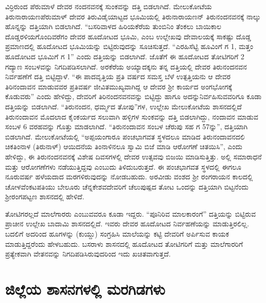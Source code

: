 ವಿರ್ರಿರುಂದ ಪೆರುಮಾಳೆ ದೇವರ ನಂದನವನಕ್ಕೆ ಸುಂಕವನ್ನು ದತ್ತಿ ಬಿಡಲಾಗಿದೆ. ಮೇಲುಕೋಟೆಯ ತಿರುನಾರಾಯಣಪೆರುಮಾಳ್​ ದೇವರ ತಿರುವಿಡೈಯಾಟ್ಟದ ಭೂಮಿಯಲ್ಲಿ ತಿರುನಾರಾಯಣನ್​ ತಿರುನಂದನವನಕ್ಕೆ ನಾಲ್ಕು ಹೊನ್ನನ್ನು ದತ್ತಿಯಾಗಿ ಬಿಡಲಾಗಿದೆ. “ಬಸರಿವಾಳದ ಹಿರಿಯಕೆರೆಯ ತುಂಬಿನಿಂ ತೆಂಕಲು ಬಾಯಿಕಾಲ ದೊಡ್ಡರಳಿಯಗೊಂದಿವರೆಗಂ ದೇವರ ಹೂದೋಟದ ಭೂಮಿ, ಎಂಬ ಉಲ್ಲೇಖವು ದೇವಾಲಯಕ್ಕೆ ಸಾಕಷ್ಟು ದೊಡ್ಡ ಪ್ರಮಾಣದಲ್ಲಿ ಹೂದೋಟದ ಭೂಮಿಯನ್ನು ಬಿಟ್ಟಿರುವುದನ್ನು ಸೂಚಿಸುತ್ತದೆ. “ಎರಹಿಸೆಟ್ಟಿ ಹೂವಿಂಗೆ ಗ 1, ಮತ್ತಂ ಹೂದೋಟದ ಭೂಮಿಗೆ ಗ 1” ಎಂದು ದತ್ತಿಯನ್ನು ಬಿಡಲಾಗಿದೆ. ಜೊತೆಗೆ ಈ ಹೂದೋಟದ ತೋಟಿಗರಿಗೆ 2 ಗದ್ಯಾಣ ಸಂಬಳವನ್ನು ನಿಗದಿಪಡಿಸಲಾಗಿದೆ. ಅರಕೆರೆಯ ಅಯ್ಯಾದಕ್ಕನು ತನ್ನ ದತ್ತಿಯಲ್ಲಿ ದೇವರ ತಿರುನಂದನವನ ನಿರ್ವಹಣೆಗೆ ದತ್ತಿ ಬಿಟ್ಟಿದ್ದಾಳೆ. “ಈ ಪಾದವೃತ್ತಿಯ ಪ್ರತಿ ವರ್ಷದ ಸಮಸ್ತ ಬೆಳೆ ಉತ್ಪತ್ತಿಯನು ಆ ದೇವರ ತಿರಿನಂದಾವನ ಮಾಡುವವರ ಪ್ರತಿವರ್ಷ ಜೀವಿತಮುಖ್ಯವಾಗಿದ್ದ ಆ ದೇವರ ಶ‍್ರೀ ಕಾರ್ಯದ ಅಂಗಭೋಗಕ್ಕೆ ಕೊಡುವರು” ಎಂದು ಹೇಳಿದ್ದು, ದೇವರಿಗೆ ತಿರಿನಂದನವನವನ್ನು ಬಿಟ್ಟಿದ್ದು ಹಾಗೂ ಅದನ್ನು\break ನಿರ್ವಹಿಸುವವರಿಗೂ ಕೂಡಾ ದತ್ತಿಯನ್ನು ಬಿಡಲಾಗಿದೆ. “ತಿರುನಂದನ, ಧರ್ಮ್ಮದ ತೋಪು”ಗಳ, ಉಲ್ಲೇಖ ಮೇಲುಕೋಟೆಯ ಶಾಸನದಲ್ಲಿದೆ ತಿರುನಂದಾವನ ಮೊದಲಾದ ಕೈಂಕರ್ಯದ ಸಲುವಾಗಿ ಹಳ್ಳಿಗಳ ಸುಂಕವನ್ನು ದತ್ತಿ ಬಿಡಲಾಗಿದ್ದು, ನಂದಾವನ ಮಾಡುವ ಸಂಬಳ 6 ವರಹವನ್ನು ಗೊತ್ತು ಮಾಡಲಾಗಿದೆ. “ತಿರುನಂದಾವನ ಸಂಬಳ ಚೆರುಪು ಸಹ ಗ 57ನ್ನು”, ದತ್ತಿಯಾಗಿ ಬಿಡಲಾಗಿದೆ. ಮೇಲುಕೋಟೆಯಲ್ಲಿ “ಅಪ್ಪಯಂಗಾರೂ ಪಂಚಭಾಗವತ ಸ್ಥಳದಲೂ ಮಾಡಿದ ತಿರುನಂದಾವನದಲಿ ಚಿಕತಿಂನಾಳ (ತಿರುನಾಳ್) ಆಯಿದನೆಯ ತಿಂನಾಳಿನಲೂ ಸ್ವಾಮಿ ಬಿಜೆ ಮಾಡಿ ಆರೋಗಣೆ ಚಿತಯಿಸಿ”, ಎಂದು ಹೇಳಿದ್ದು, ಈ ತಿರುನಂದನವನಕ್ಕೆ ವಿಶೇಷ ದಿವಸಗಳಲ್ಲಿ ದೇವರ ಉತ್ಸವವು ಬಿಜಯಿ ಮಾಡಿಸುತ್ತಿತ್ತು. ಅಲ್ಲಿ ಸಮಾರಾಧನೆ ಮತ್ತು ಆರೋಗಣೆಗಳು ನಡೆಯುತ್ತಿದ್ದವು ಎಂಬುದು ತಿಳಿದುಬರುತ್ತದೆ. ಈ ಪಂಚಭಾಗವತ ಸ್ಥಳದಲ್ಲಿ ಈಗಲೂ ನೂರುವರ್ಷ ಹಳೆಯದಾದ ಮರಗಳಿರುವುದನ್ನು ನೋಡಬಹುದು. ಅರವೀಡು ವಂಶದ ಶ‍್ರೀ ರಂಗರಾಯನ ಕಾಲದಲ್ಲಿ ಚೋಳವೆಂಕಟಪತಿಯು ಬೇಲೂರು ಚೆನ್ನಕೇಶವ\-ದೇವರಿಗೆ ಚೆಲುಪುಷ್ಪದ ತೋಟ ಒಂದನ್ನು ದತ್ತಿಯಾಗಿ ಬಿಟ್ಟನೆಂದು ಶ‍್ರೀರಂಗಪಟ್ಟಣ ಶಾಸನದಲ್ಲಿ ಹೇಳಿದೆ.

ತೋಟಿಗರಲ್ಲದೆ ಮಾಲೆಗಾರರು ಎಂಬುವವರೂ ಕೂಡಾ ಇದ್ದರು. “ಪೂನಿರಿವ ಮಾಲಕಾರಂಗೆ” ದತ್ತಿಯನ್ನು ಬಿಟ್ಟಿರುವ ಪ್ರಾಚೀನ ಉಲ್ಲೇಖ ಬಾದಾಮಿ ಶಾಸನದಲ್ಲಿದೆ. ಇವರು ದೇವರ ಹೂದೋಟದ ನಿರ್ವಹಣೆಯನ್ನು ಮಾಡುತ್ತಿರಲಿಲ್ಲ. ಬದಲಿಗೆ ಅದರಿಂದ ಹೂಗಳನ್ನು (ಕುಯ್ದು) ಸಂಗ್ರಹಿಸಿ ಮಾಲೆಯನ್ನು ಕಟ್ಟಿ ದೇವರಿಗೆ ಅರ್ಪಿಸುವ ಕಾಯಕ ಮಾಡುತ್ತಿದ್ದರೆಂದು ಹೇಳಬಹುದು. ಬಸರಾಳು ಶಾಸನದಲ್ಲಿ ಹೂದೋಟದ ತೋಟಿಗರಿಗೆ ಮತ್ತು ಮಾಲೆಗಾರರಿಗೆ ಪ್ರತ್ಯೇಕವಾಗಿ ವೇತನವನ್ನು ನಿಗದಿಪಡಿಸಿರುವುದರಿಂದ ಇದು ಖಚಿತವಾಗುತ್ತದೆ.


\section{ಜಿಲ್ಲೆಯ ಶಾಸನಗಳಲ್ಲಿ ಮರಗಿಡಗಳು}

